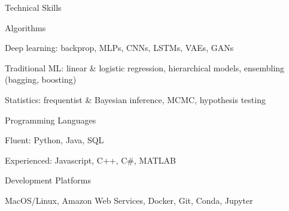 \documentclass{resume} %
\begin{document}
\begin{rSection}{Technical Skills}

\begin{rSubsection}{Algorithms}{}{}{}
	\item Deep learning: backprop, MLPs, CNNs, LSTMs, VAEs, GANs
	\item Traditional ML: linear \& logistic regression, hierarchical models, ensembling (bagging, boosting)
	\item Statistics: frequentist \& Bayesian inference, MCMC, hypothesis testing
\end{rSubsection}
\begin{rSubsection}{Programming Languages}{}{}{}
	\item Fluent: Python, Java, SQL
	\item Experienced: Javascript, C++, C\#, MATLAB
\end{rSubsection}
\begin{rSubsection}{Development Platforms}{}{}{}
	\item MacOS/Linux, Amazon Web Services, Docker, Git, Conda, Jupyter
\end{rSubsection}


\end{rSection}

\end{document}
